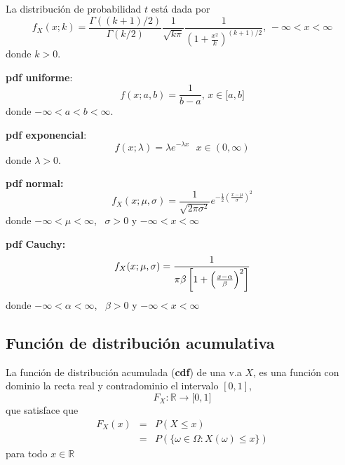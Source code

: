 La distribución de probabilidad $t$ está dada por
\begin{equation*}
f_{X}(x;k)=\frac{\Gamma ((k+1)/2)}{\Gamma (k/2)}\frac{1}{\sqrt{k\pi }}\frac{1
}{\left( 1+\frac{x^{2}}{k}\right) ^{(k+1)/2}}\text{, }-\infty <x<\infty
\end{equation*}
donde $k>0.$

\textbf{pdf uniforme}: 
\begin{equation*}
f(x;a,b)=\frac{1}{b-a}\text{, \ }x\in \lbrack a,b]
\end{equation*}%
donde $-\infty <a<b<\infty$.

\textbf{pdf exponencial}:
\begin{equation*}
f(x;\lambda )=\lambda e^{-\lambda x}\text{ }x\in (0,\infty )
\end{equation*}%
donde $\lambda >0.$


\textbf{pdf normal:}
\begin{equation*}
f_{X}(x;\mu ,\sigma )=\frac{1}{\sqrt{2\pi \sigma ^{2}}}e^{-\frac{1}{2}\left( 
\frac{x-\mu }{\sigma }\right) ^{2}}
\end{equation*}
donde $-\infty <\mu <\infty $, \ $\sigma >0$ y $-\infty <x<\infty $


\textbf{pdf Cauchy:}
\begin{equation*}
f_{X}(x;\mu ,\sigma )=\frac{1}{\pi \beta \left[ 1+\left( \frac{x-\alpha }{%
\beta }\right) ^{2}\right] }
\end{equation*}
donde $-\infty <\alpha <\infty $, \ $\beta >0$ y $-\infty <x<\infty $


\subsection{Función de distribución acumulativa}

\begin{definition}[cdf]
La función de distribución acumulada (\textbf{cdf}) de una v.a $X$, es una función con dominio la recta real y contradominio el intervalo $[0,1]$,
\begin{equation*}
F_{X}:\mathbb{R}
\rightarrow \lbrack 0,1]
\end{equation*}
que satisface que 
\begin{eqnarray*}
F_{X}(x) &=&P(X\leq x) \\
&=&P(\{\omega \in \Omega :X(\omega )\leq x\})
\end{eqnarray*}
para todo $x\in \mathbb{R}$
\end{definition}

